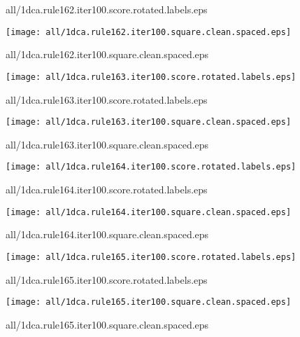 \documentclass{article}
\begin{document}
{\footnotesize all/1dca.rule162.iter100.score.rotated.labels.eps}
\begin{center}
\begin{minipage}{\textwidth}
\texttt{[image: all/1dca.rule162.iter100.square.clean.spaced.eps]}
\end{minipage}
\end{center}
{\footnotesize all/1dca.rule162.iter100.square.clean.spaced.eps}
\begin{center}
\begin{minipage}{\textwidth}
\texttt{[image: all/1dca.rule163.iter100.score.rotated.labels.eps]}
\end{minipage}
\end{center}
{\footnotesize all/1dca.rule163.iter100.score.rotated.labels.eps}
\begin{center}
\begin{minipage}{\textwidth}
\texttt{[image: all/1dca.rule163.iter100.square.clean.spaced.eps]}
\end{minipage}
\end{center}
{\footnotesize all/1dca.rule163.iter100.square.clean.spaced.eps}
\begin{center}
\begin{minipage}{\textwidth}
\texttt{[image: all/1dca.rule164.iter100.score.rotated.labels.eps]}
\end{minipage}
\end{center}
{\footnotesize all/1dca.rule164.iter100.score.rotated.labels.eps}
\begin{center}
\begin{minipage}{\textwidth}
\texttt{[image: all/1dca.rule164.iter100.square.clean.spaced.eps]}
\end{minipage}
\end{center}
{\footnotesize all/1dca.rule164.iter100.square.clean.spaced.eps}
\begin{center}
\begin{minipage}{\textwidth}
\texttt{[image: all/1dca.rule165.iter100.score.rotated.labels.eps]}
\end{minipage}
\end{center}
{\footnotesize all/1dca.rule165.iter100.score.rotated.labels.eps}
\begin{center}
\begin{minipage}{\textwidth}
\texttt{[image: all/1dca.rule165.iter100.square.clean.spaced.eps]}
\end{minipage}
\end{center}
{\footnotesize all/1dca.rule165.iter100.square.clean.spaced.eps}
\end{document}
